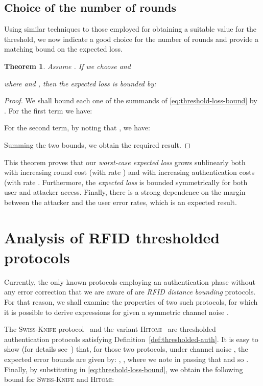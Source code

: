 \documentclass[a4paper]{article}
\newenvironment{IEEEproof}{\begin{proof}}{\end{proof}}
\newcommand \Swiss {\textsc{Swiss-Knife}}
\newcommand \Hitomi {\textsc{Hitomi}}
\theoremstyle{plain} \newtheorem{remark}{Remark}
\theoremstyle{plain} \newtheorem{definition}{Definition}
\theoremstyle{plain} \newtheorem{example}{Example}
\theoremstyle{plain} \newtheorem{assumption}{Assumption}
\theoremstyle{plain} \newtheorem{conjecture}{Conjecture}
\theoremstyle{plain} \newtheorem{theorem}{Theorem}
\theoremstyle{plain} \newtheorem{proposition}{Proposition}
\theoremstyle{plain} \newtheorem{lemma}{Lemma}
\theoremstyle{plain} \newtheorem{corollary}{Corollary}
\begin{document}
\subsection{Choice of the number of rounds}
\label{sec:rounds-choice}
Using similar techniques to those employed for obtaining a suitable
value for the threshold, we now indicate a good choice for the number
of rounds  and provide a matching bound on the expected loss.
\begin{theorem}
  Assume . If we choose 
  and
  
  where  and , then the expected
  loss  is bounded by:
  
  \label{the:rounds}
\end{theorem}
\begin{IEEEproof}
  We shall bound each one of the summands of \eqref{eq:threshold-loss-bound}
  by .
For the first term we have:
  
  For the second term, by noting that , we have:
  
  Summing the two bounds, we obtain the required result.
\end{IEEEproof}

This theorem proves that our {\em worst-case expected loss} 
grows sublinearly both with increasing round cost (with rate
) and with increasing authentication costs (with
rate . Furthermore, the {\em expected loss} is
bounded symmetrically for both user and attacker access. Finally,
there is a strong dependence on the margin  between the
attacker and the user error rates, which is an expected result.

\section{Analysis of RFID thresholded protocols}
\label{sec:specific-protocols}

Currently, the only known protocols employing an authentication
phase without any error correction that we are aware of are {\em RFID
  distance bounding} protocols. For that reason, we shall examine the
properties of two such protocols, for which it is possible to derive
expressions for  given a symmetric channel noise .

The {\Swiss} protocol~\cite{KimAKSP-2008-icisc} and the
variant {\Hitomi}~\cite{sheddingLight}
are thresholded authentication protocols satisfying
Definition~\ref{def:thresholded-auth}.  It is easy to show (for
details see~\cite{sheddingLight}) that, for those two protocols, under
channel noise , the expected error bounds  are given
by: , , where we note in
passing that  and so .
Finally, by substituting 
in \eqref{eq:threshold-loss-bound}, we obtain the following bound for
{\Swiss} and {\Hitomi}:
\end{document}

